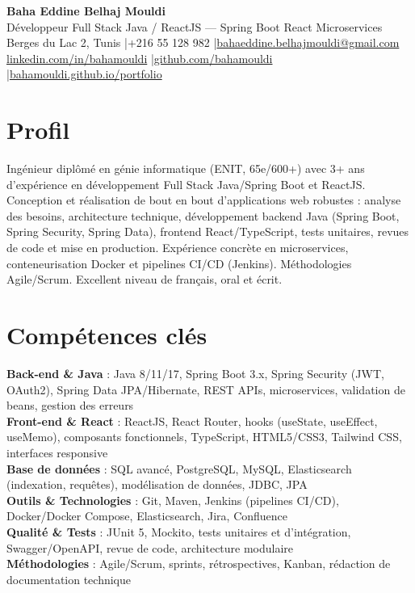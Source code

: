 \documentclass[a4paper,10pt]{article}
\begin{document}
\begin{center}
{\LARGE\bfseries\color{navy} Baha Eddine Belhaj Mouldi}\\[3pt]
{\large Développeur Full Stack Java / ReactJS --- Spring Boot \textbar React \textbar Microservices}\\[4pt]
Berges du Lac 2, Tunis \quad|\quad +216 55 128 982 \quad|\quad \href{mailto:bahaeddine.belhajmouldi@gmail.com}{bahaeddine.belhajmouldi@gmail.com}\\[1pt]
\href{https://www.linkedin.com/in/bahamouldi}{linkedin.com/in/bahamouldi} \quad|\quad \href{https://github.com/bahamouldi}{github.com/bahamouldi} \quad|\quad \href{https://bahamouldi.github.io/portfolio/}{bahamouldi.github.io/portfolio}
\end{center}
\vspace{2pt}
\section{Profil}
Ingénieur diplômé en génie informatique (ENIT, 65e/600+) avec 3+ ans d'expérience en développement Full Stack Java/Spring Boot et ReactJS. Conception et réalisation de bout en bout d'applications web robustes : analyse des besoins, architecture technique, développement backend Java (Spring Boot, Spring Security, Spring Data), frontend React/TypeScript, tests unitaires, revues de code et mise en production. Expérience concrète en microservices, conteneurisation Docker et pipelines CI/CD (Jenkins). Méthodologies Agile/Scrum. Excellent niveau de français, oral et écrit.

\section{Compétences clés}
\textbf{Back-end \& Java} : Java 8/11/17, Spring Boot 3.x, Spring Security (JWT, OAuth2), Spring Data JPA/Hibernate, REST APIs, microservices, validation de beans, gestion des erreurs\\[0.5pt]
\textbf{Front-end \& React} : ReactJS, React Router, hooks (useState, useEffect, useMemo), composants fonctionnels, TypeScript, HTML5/CSS3, Tailwind CSS, interfaces responsive\\[0.5pt]
\textbf{Base de données} : SQL avancé, PostgreSQL, MySQL, Elasticsearch (indexation, requêtes), modélisation de données, JDBC, JPA\\[0.5pt]
\textbf{Outils \& Technologies} : Git, Maven, Jenkins (pipelines CI/CD), Docker/Docker Compose, Elasticsearch, Jira, Confluence\\[0.5pt]
\textbf{Qualité \& Tests} : JUnit 5, Mockito, tests unitaires et d'intégration, Swagger/OpenAPI, revue de code, architecture modulaire\\[0.5pt]
\textbf{Méthodologies} : Agile/Scrum, sprints, rétrospectives, Kanban, rédaction de documentation technique
\end{document}
